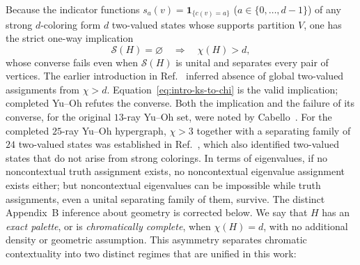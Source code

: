 \documentclass[aps,pra,reprint,superscriptaddress,longbibliography,nofootinbib,floatfix,10pt]{revtex4-2}
\theoremstyle{definition}\newtheorem{definition}[theorem]{Definition}
\theoremstyle{remark}\newtheorem{remark}[theorem]{Remark}
\begin{document}
Because the indicator functions $s_a(v)=\mathbf 1_{\{c(v)=a\}}$ ($a\in\{0,\ldots,d-1\}$) of any strong $d$-coloring form $d$ two-valued states whose supports partition $V$, one has the strict one-way implication
\begin{equation}\label{eq:intro-ks-to-chi}
\mathcal S(H)=\varnothing \quad\Longrightarrow\quad \chi(H)>d,
\end{equation}
whose converse fails even when $\mathcal S(H)$ is unital and separates every pair of vertices. The earlier introduction in Ref.~\cite{svozil-2021-chroma} inferred absence of global two-valued assignments from $\chi>d$. Equation~\eqref{eq:intro-ks-to-chi} is the valid implication; completed Yu--Oh refutes the converse. Both the implication and the failure of its converse, for the original $13$-ray Yu--Oh set, were noted by Cabello~\cite{cabello2012maxnonlocality}. For the completed $25$-ray Yu--Oh hypergraph, $\chi>3$ together with a separating family of $24$ two-valued states was established in Ref.~\cite{svozil-2025-color}, which also identified two-valued states that do not arise from strong colorings. In terms of eigenvalues, if no noncontextual truth assignment exists, no noncontextual eigenvalue assignment exists either; but noncontextual eigenvalues can be impossible while truth assignments, even a unital separating family of them, survive. The distinct Appendix~B inference about geometry is corrected below. We say that $H$ has an \emph{exact palette}, or is \emph{chromatically complete}, when $\chi(H)=d$, with no additional density or geometric assumption. This asymmetry separates chromatic contextuality into two distinct regimes that are unified in this work:
\end{document}
